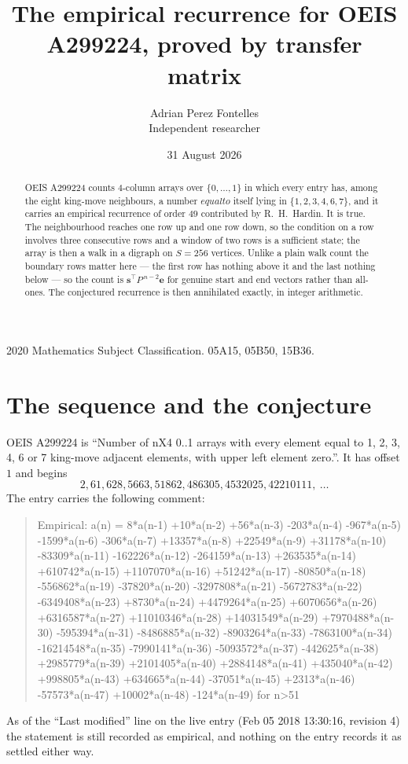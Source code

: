 \documentclass[11pt,a4paper]{article}
\title{The empirical recurrence for OEIS A299224, proved by transfer matrix}
\author{Adrian Perez Fontelles\\ \small Independent researcher}
\date{31 August 2026}
\theoremstyle{plain}
\theoremstyle{definition}
\begin{document}
\maketitle

\begin{abstract}
OEIS A299224 counts $4$-column arrays over $\{0,\dots,1\}$ in which every entry has,
among the eight king-move neighbours, a number $equal to$ itself lying in $\{1,2,3,4,6,7\}$, and it carries an empirical
recurrence of order $49$ contributed by R.~H.~Hardin. It is true. The neighbourhood
reaches one row up and one row down, so the condition on a row involves three consecutive
rows and a window of two rows is a sufficient state; the array is then a walk in a digraph
on $S=256$ vertices. Unlike a plain walk count the boundary rows matter here --- the first
row has nothing above it and the last nothing below --- so the count is
$\mathbf{s}^{\!\top}P^{\,n-2}\mathbf{e}$ for genuine start and end vectors rather than
all-ones. The conjectured recurrence is then annihilated exactly, in integer arithmetic.
\end{abstract}

\noindent\small 2020 Mathematics Subject Classification. 05A15, 05B50, 15B36.\normalsize

\section{The sequence and the conjecture}

OEIS A299224 is ``Number of nX4 0..1 arrays with every element equal to 1, 2, 3, 4, 6 or 7 king-move adjacent elements, with upper left element zero.''. It has offset
$1$ and begins
\[
2, 61, 628, 5663, 51862, 486305, 4532025, 42210111,\ \dots
\]
The entry carries the following comment:
\begin{quote}\small
Empirical: a(n) = 8*a(n-1) +10*a(n-2) +56*a(n-3) -203*a(n-4) -967*a(n-5) -1599*a(n-6) -306*a(n-7) +13357*a(n-8) +22549*a(n-9) +31178*a(n-10) -83309*a(n-11) -162226*a(n-12) -264159*a(n-13) +263535*a(n-14) +610742*a(n-15) +1107070*a(n-16) +51242*a(n-17) -80850*a(n-18) -556862*a(n-19) -37820*a(n-20) -3297808*a(n-21) -5672783*a(n-22) -6349408*a(n-23) +8730*a(n-24) +4479264*a(n-25) +6070656*a(n-26) +6316587*a(n-27) +11010346*a(n-28) +14031549*a(n-29) +7970488*a(n-30) -595394*a(n-31) -8486885*a(n-32) -8903264*a(n-33) -7863100*a(n-34) -16214548*a(n-35) -7990141*a(n-36) -5093572*a(n-37) -442625*a(n-38) +2985779*a(n-39) +2101405*a(n-40) +2884148*a(n-41) +435040*a(n-42) +998805*a(n-43) +634665*a(n-44) -37051*a(n-45) +2313*a(n-46) -57573*a(n-47) +10002*a(n-48) -124*a(n-49) for n>51
\end{quote}
As of the ``Last modified'' line on the live entry (Feb 05 2018 13:30:16, revision
4) the statement is still recorded as empirical, and nothing on the entry
records it as settled either way.
\end{document}

